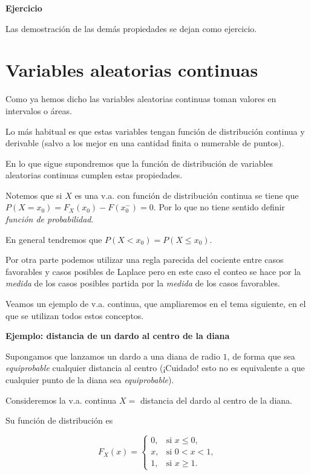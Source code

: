 \documentclass[
  letterpaper,
  DIV=11,
  numbers=noendperiod]{scrreprt}
\begin{document}
\textbf{Ejercicio}

Las demostración de las demás propiedades se dejan como ejercicio.

\hypertarget{variables-aleatorias-continuas}{%
\section{Variables aleatorias
continuas}\label{variables-aleatorias-continuas}}

Como ya hemos dicho las variables aleatorias continuas toman valores en
intervalos o áreas.

Lo más habitual es que estas variables tengan función de distribución
continua y derivable (salvo a los mejor en una cantidad finita o
numerable de puntos).

En lo que sigue supondremos que la función de distribución de variables
aleatorias continuas cumplen estas propiedades.

Notemos que si \(X\) es una v.a. con función de distribución continua se
tiene que \(P(X=x_0)=F_X(x_0)-F(x_0^{-})=0\). Por lo que no tiene
sentido definir \emph{función de probabilidad}.

En general tendremos que \(P(X<x_0)=P(X\leq x_0)\).

Por otra parte podemos utilizar una regla parecida del cociente entre
casos favorables y casos posibles de Laplace pero en este caso el conteo
se hace por la \emph{medida} de los casos posibles partida por la
\emph{medida} de los casos favorables.

Veamos un ejemplo de v.a. continua, que ampliaremos en el tema
siguiente, en el que se utilizan todos estos conceptos.

\textbf{Ejemplo: distancia de un dardo al centro de la diana}

Supongamos que lanzamos un dardo a una diana de radio \(1\), de forma
que sea \emph{equiprobable} cualquier distancia al centro (¡Cuidado!
esto no es equivalente a que cualquier punto de la diana sea
\emph{equiprobable}).

Consideremos la v.a. continua \(X=\) distancia del dardo al centro de la
diana.

Su función de distribución es

\[
F_{X}(x)=
\left\{
\begin{array}{ll}
0, & \mbox{si } x\leq 0,\\
x, & \mbox{si } 0<x<1,\\
1, & \mbox{si } x\geq 1.
\end{array}
\right.
\]
\end{document}
